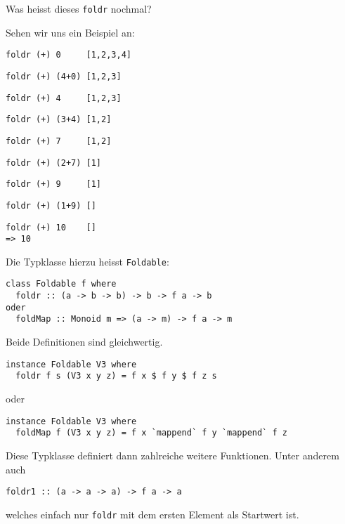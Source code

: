 \documentclass{beamer}
\begin{document}
\begin{frame}[fragile]
Was heisst dieses \texttt{foldr} nochmal?\\\par
\pause
Sehen wir uns ein Beispiel an:
\begin{overprint}
\begin{verbatim}
foldr (+) 0     [1,2,3,4]
\end{verbatim}
\begin{verbatim}
foldr (+) (4+0) [1,2,3]
\end{verbatim}
\begin{verbatim}
foldr (+) 4     [1,2,3]
\end{verbatim}
\begin{verbatim}
foldr (+) (3+4) [1,2]
\end{verbatim}
\begin{verbatim}
foldr (+) 7     [1,2]
\end{verbatim}
\begin{verbatim}
foldr (+) (2+7) [1]
\end{verbatim}
\begin{verbatim}
foldr (+) 9     [1]
\end{verbatim}
\begin{verbatim}
foldr (+) (1+9) []
\end{verbatim}
\begin{verbatim}
foldr (+) 10    []
=> 10
\end{verbatim}
\end{overprint}

\end{frame}


\begin{frame}[fragile]
Die Typklasse hierzu heisst \texttt{Foldable}:
\begin{verbatim}
class Foldable f where
  foldr :: (a -> b -> b) -> b -> f a -> b
oder
  foldMap :: Monoid m => (a -> m) -> f a -> m
\end{verbatim}
\pause
\smallskip

Beide Definitionen sind gleichwertig.\smallskip

\pause
\begin{verbatim}
instance Foldable V3 where
  foldr f s (V3 x y z) = f x $ f y $ f z s
\end{verbatim}
\pause
oder
\begin{verbatim}
instance Foldable V3 where
  foldMap f (V3 x y z) = f x `mappend` f y `mappend` f z
\end{verbatim}
\pause
Diese Typklasse definiert dann zahlreiche weitere Funktionen. Unter anderem auch
\begin{verbatim}
foldr1 :: (a -> a -> a) -> f a -> a
\end{verbatim}
welches einfach nur \texttt{foldr} mit dem ersten Element als Startwert ist.
\end{frame}
\end{document}

